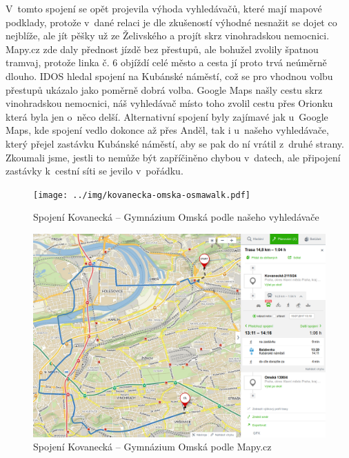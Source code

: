 V~tomto spojení se opět projevila výhoda vyhledávačů, které mají mapové
podklady, protože v~dané relaci je dle zkušeností výhodné nesnažit se dojet co
nejblíže, ale jít pěšky už ze Želivského a projít skrz vinohradskou nemocnici.
Mapy.cz zde daly přednost jízdě bez přestupů, ale bohužel zvolily špatnou
tramvaj, protože linka č. 6 objíždí celé město a cesta jí proto trvá neúměrně
dlouho. IDOS hledal spojení na Kubánské náměstí, což se pro vhodnou volbu
přestupů ukázalo jako poměrně dobrá volba. Google Maps našly cestu skrz
vinohradskou nemocnici, náš vyhledávač místo toho zvolil cestu přes Orionku
která byla jen o~něco delší. Alternativní spojení byly zajímavé jak u~Google
Maps, kde spojení vedlo dokonce až přes Anděl, tak i u~našeho
vyhledávače, který přejel zastávku Kubánské náměstí, aby se pak do ní vrátil
z~druhé strany. Zkoumali jsme, jestli to nemůže být zapříčiněno chybou v~datech,
ale připojení zastávky k~cestní síti se jevilo v~pořádku. 
\begin{figure}[h]
  \centering
    \texttt{[image: ../img/kovanecka-omska-osmawalk.pdf]}
  \caption{Spojení Kovanecká -- Gymnázium Omská podle našeho vyhledávače}
  \label{fig:kovanecka-omska-osmawalk}
\end{figure}
\begin{figure}[h]
  \centering
    \includegraphics[width=\textwidth]{../img/kovanecka-omska-seznam.png}
  \caption{Spojení Kovanecká -- Gymnázium Omská podle Mapy.cz}
  \label{fig:kovanecka-omska-seznam}
\end{figure}
